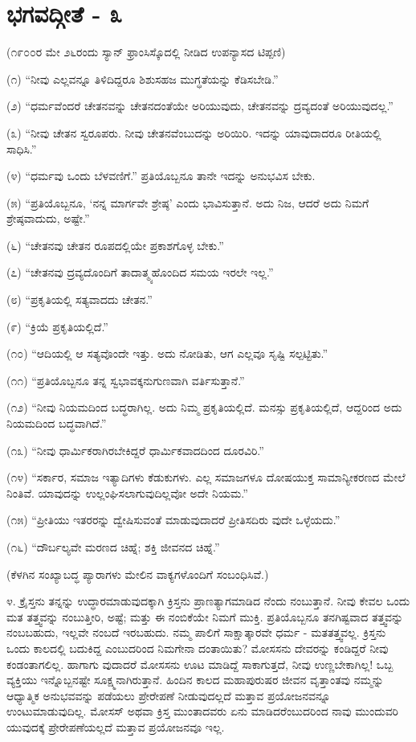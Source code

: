 
\chapter{ಭಗವದ್ಗೀತೆ - ೩}

(೧೯೦೦ರ ಮೇ ೨೬ರಂದು ಸ್ಯಾನ್ ಫ್ರಾಂಸಿಸ್ಕೊದಲ್ಲಿ ನೀಡಿದ ಉಪನ್ಯಾಸದ ಟಿಪ್ಪಣಿ)

(೧) “ನೀವು ಎಲ್ಲವನ್ನೂ ತಿಳಿದಿದ್ದರೂ ಶಿಶುಸಹಜ ಮುಗ್ಧತೆಯನ್ನು ಕೆಡಿಸಬೇಡಿ.”

(೨) “ಧರ್ಮವೆಂದರೆ ಚೇತನವನ್ನು ಚೇತನದಂತೆಯೇ ಅರಿಯುವುದು, ಚೇತನವನ್ನು ದ್ರವ್ಯದಂತೆ ಅರಿಯುವುದಲ್ಲ.”

(೩) “ನೀವು ಚೇತನ ಸ್ವರೂಪರು. ನೀವು ಚೇತನವೆಂಬುದನ್ನು ಅರಿಯಿರಿ. ಇದನ್ನು ಯಾವುದಾದರೂ ರೀತಿಯಲ್ಲಿ ಸಾಧಿಸಿ.”

(೪) “ಧರ್ಮವು ಒಂದು ಬೆಳವಣಿಗೆ.” ಪ್ರತಿಯೊಬ್ಬನೂ ತಾನೇ ಇದನ್ನು ಅನುಭವಿಸ ಬೇಕು.

(೫) “ಪ್ರತಿಯೊಬ್ಬನೂ, ‘ನನ್ನ ಮಾರ್ಗವೇ ಶ್ರೇಷ್ಠ’ ಎಂದು ಭಾವಿಸುತ್ತಾನೆ. ಅದು ನಿಜ, ಆದರೆ ಅದು ನಿಮಗೆ ಶ್ರೇಷ್ಠವಾದುದು, ಅಷ್ಟೇ.”

(೬) “ಚೇತನವು ಚೇತನ ರೂಪದಲ್ಲಿಯೇ ಪ್ರಕಾಶಗೊಳ್ಳ ಬೇಕು.”

(೭) “ಚೇತನವು ದ್ರವ್ಯದೊಂದಿಗೆ ತಾದಾತ್ಮ್ಯಹೊಂದಿದ ಸಮಯ ಇರಲೇ ಇಲ್ಲ.”

(೮) “ಪ್ರಕೃತಿಯಲ್ಲಿ ಸತ್ಯವಾದದು ಚೇತನ.”

(೯) “ಕ್ರಿಯೆ ಪ್ರಕೃತಿಯಲ್ಲಿದೆ.”

(೧೦) “ಆದಿಯಲ್ಲಿ ಆ ಸತ್ಯವೊಂದೇ ಇತ್ತು. ಅದು ನೋಡಿತು, ಆಗ ಎಲ್ಲವೂ ಸೃಷ್ಟಿ ಸಲ್ಪಟ್ಟಿತು.”

(೧೧) “ಪ್ರತಿಯೊಬ್ಬನೂ ತನ್ನ ಸ್ವಭಾವಕ್ಕನುಗುಣವಾಗಿ ವರ್ತಿಸುತ್ತಾನೆ.”

(೧೨) “ನೀವು ನಿಯಮದಿಂದ ಬದ್ಧರಾಗಿಲ್ಲ. ಅದು ನಿಮ್ಮ ಪ್ರಕೃತಿಯಲ್ಲಿದೆ. ಮನಸ್ಸು ಪ್ರಕೃತಿಯಲ್ಲಿದೆ, ಆದ್ದರಿಂದ ಅದು ನಿಯಮದಿಂದ ಬದ್ಧವಾಗಿದೆ.”

(೧೩) “ನೀವು ಧಾರ್ಮಿಕರಾಗಿರಬೇಕಿದ್ದರೆ ಧಾರ್ಮಿಕವಾದದಿಂದ ದೂರವಿರಿ.”

(೧೪) “ಸರ್ಕಾರ, ಸಮಾಜ ಇತ್ಯಾದಿಗಳು ಕೆಡುಕುಗಳು. ಎಲ್ಲ ಸಮಾಜಗಳೂ ದೋಷಯುಕ್ತ ಸಾಮಾನ್ಯೀಕರಣದ ಮೇಲೆ ನಿಂತಿವೆ. ಯಾವುದನ್ನು ಉಲ್ಲಂಘಿಸಲಾಗುವುದಿಲ್ಲವೋ ಅದೇ ನಿಯಮ.”

(೧೫) “ಪ್ರೀತಿಯು ಇತರರನ್ನು ದ್ವೇಷಿಸುವಂತೆ ಮಾಡುವುದಾದರೆ ಪ್ರೀತಿಸದಿರು ವುದೇ ಒಳ್ಳೆಯದು.”

(೧೬) “ದೌರ್ಬಲ್ಯವೇ ಮರಣದ ಚಿಹ್ನೆ; ಶಕ್ತಿ ಜೀವನದ ಚಿಹ್ನೆ.”

(ಕೆಳಗಿನ ಸಂಖ್ಯಾಬದ್ಧ ಪ್ಯಾರಾಗಳು ಮೇಲಿನ ವಾಕ್ಯಗಳೊಂದಿಗೆ ಸಂಬಂಧಿಸಿವೆ.)

೪. ಕ್ರೈಸ್ತನು ತನ್ನನ್ನು ಉದ್ಧಾರಮಾಡುವುದಕ್ಕಾಗಿ ಕ್ರಿಸ್ತನು ಪ್ರಾಣತ್ಯಾಗಮಾಡಿದ ನೆಂದು ನಂಬುತ್ತಾನೆ. ನೀವು ಕೇವಲ ಒಂದು ಮತ ತತ್ತ್ವವನ್ನು ನಂಬುತ್ತೀರಿ, ಅಷ್ಟೆ; ಮತ್ತು ಈ ನಂಬಿಕೆಯೇ ನಿಮಗೆ ಮುಕ್ತಿ. ಪ್ರತಿಯೊಬ್ಬನೂ ತನಗಿಷ್ಟವಾದ ತತ್ತ್ವವನ್ನು ನಂಬಬಹುದು, ಇಲ್ಲವೇ ನಂಬದೆ ಇರಬಹುದು. ನಮ್ಮ ಪಾಲಿಗೆ ಸಾಕ್ಷಾತ್ಕಾರವೇ ಧರ್ಮ - ಮತತತ್ತ್ವವಲ್ಲ. ಕ್ರಿಸ್ತನು ಒಂದು ಕಾಲದಲ್ಲಿ ಬದುಕಿದ್ದ ಎಂಬುದರಿಂದ ನಿಮಗೇನಾ ದಂತಾಯಿತು? ಮೋಸಸನು ದೇವರನ್ನು ಕಂಡಿದ್ದರೆ ನೀವು ಕಂಡಂತಾಗಲಿಲ್ಲ. ಹಾಗಾಗು ವುದಾದರೆ ಮೋಸಸನು ಊಟ ಮಾಡಿದ್ದೆ ಸಾಕಾಗುತ್ತದೆ, ನೀವು ಉಣ್ಣಬೇಕಾಗಿಲ್ಲ! ಒಬ್ಬ ವ್ಯಕ್ತಿಯು ಇನ್ನೊಬ್ಬನಷ್ಟೇ ಸೂಕ್ಷ್ಮನಾಗಿರುತ್ತಾನೆ. ಹಿಂದಿನ ಕಾಲದ ಮಹಾಪುರುಷರ ಜೀವನ ವೃತ್ತಾಂತವು ನಮ್ಮನ್ನು ಆಧ್ಯಾತ್ಮಿಕ ಅನುಭವವನ್ನು ಪಡೆಯಲು ಪ್ರೇರೇಪಣೆ ನೀಡುವುದಲ್ಲದೆ ಮತ್ತಾವ ಪ್ರಯೋಜನವನ್ನೂ ಉಂಟುಮಾಡುವುದಿಲ್ಲ. ಮೋಸಸ್ ಅಥವಾ ಕ್ರಿಸ್ತ ಮುಂತಾದವರು ಏನು ಮಾಡಿದರೆಂಬುದರಿಂದ ನಾವು ಮುಂದುವರಿ ಯುವುದಕ್ಕೆ ಪ್ರೇರೇಪಣೆಯಲ್ಲದೆ ಮತ್ತಾವ ಪ್ರಯೋಜನವೂ ಇಲ್ಲ.

